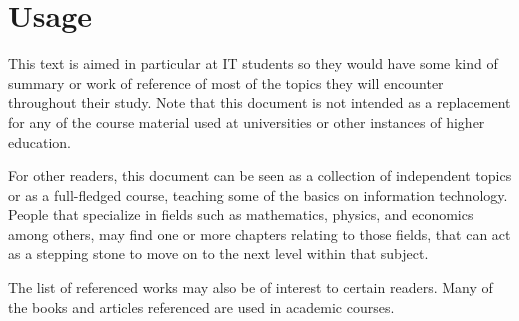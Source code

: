 \section*{Usage}

This text is aimed in particular at IT students so they would have some kind of summary or work of reference of most of the topics they will encounter throughout their study. Note that this document is not intended as a replacement for any of the course material used at universities or other instances of higher education.

For other readers, this document can be seen as a collection of independent topics or as a full-fledged course, teaching some of the basics on information technology. People that specialize in fields such as mathematics, physics, and economics among others, may find one or more chapters relating to those fields, that can act as a stepping stone to move on to the next level within that subject.

The list of referenced works may also be of interest to certain readers. Many of the books and articles referenced are used in academic courses.